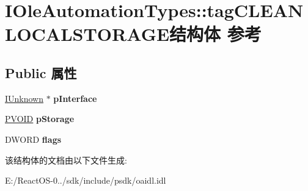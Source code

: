 \hypertarget{struct_i_ole_automation_types_1_1tag_c_l_e_a_n_l_o_c_a_l_s_t_o_r_a_g_e}{}\section{I\+Ole\+Automation\+Types\+:\+:tag\+C\+L\+E\+A\+N\+L\+O\+C\+A\+L\+S\+T\+O\+R\+A\+G\+E结构体 参考}
\label{struct_i_ole_automation_types_1_1tag_c_l_e_a_n_l_o_c_a_l_s_t_o_r_a_g_e}
\subsection*{Public 属性}
\begin{DoxyCompactItemize}
\item 
\mbox{\label{struct_i_ole_automation_types_1_1tag_c_l_e_a_n_l_o_c_a_l_s_t_o_r_a_g_e_a2c7bc3594522ad0f27f1f7e99495a1ca}} 
\hyperlink{interface_i_unknown}{I\+Unknown} $\ast$ {\bfseries p\+Interface}
\item 
\mbox{\label{struct_i_ole_automation_types_1_1tag_c_l_e_a_n_l_o_c_a_l_s_t_o_r_a_g_e_acb91a027770ad0fc5c831426a35b70ea}} 
\hyperlink{interfacevoid}{P\+V\+O\+ID} {\bfseries p\+Storage}
\item 
\mbox{\label{struct_i_ole_automation_types_1_1tag_c_l_e_a_n_l_o_c_a_l_s_t_o_r_a_g_e_a2f53177e53f8823e45a24d54743ad010}} 
D\+W\+O\+RD {\bfseries flags}
\end{DoxyCompactItemize}


该结构体的文档由以下文件生成\+:\begin{DoxyCompactItemize}
\item 
E\+:/\+React\+O\+S-\/0../sdk/include/psdk/oaidl.\+idl\end{DoxyCompactItemize}
